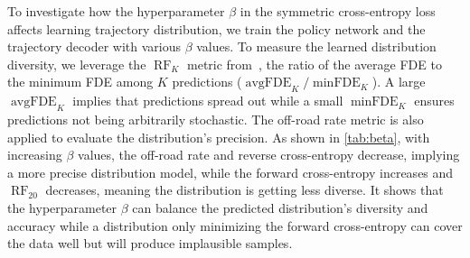 \documentclass[10pt,twocolumn,letterpaper]{article}
\begin{document}
\begin{table}
    \centering
	\vspace{-0.2cm}
	\caption{Comparison of four baselines and our method with close parameter numbers in predicting OGMs.}
	\label{tab:OGM}
\end{table}

 To investigate how the hyperparameter $\beta$ in the symmetric cross-entropy loss affects learning trajectory distribution, we train the policy network and the trajectory decoder with various $\beta$ values. To measure the learned distribution diversity, we leverage the $\operatorname{RF}_K$ metric from~\cite{park2020diverse}, \ie the ratio of the average FDE to the minimum FDE among $K$ predictions (${\operatorname{avgFDE}_K}/{\operatorname{minFDE}_K}$). A large ${\operatorname{avgFDE}_K}$ implies that predictions spread out while a small ${\operatorname{minFDE}_K}$ ensures predictions not being arbitrarily stochastic. The off-road rate metric is also applied to evaluate the distribution's precision. As shown in \cref{tab:beta}, with increasing $\beta$ values, the off-road rate and reverse cross-entropy decrease, implying a more precise distribution model, while the forward cross-entropy increases and $\operatorname{RF}_{20}$ decreases, meaning the distribution is getting less diverse. It shows that the hyperparameter $\beta$ can balance the predicted distribution's diversity and accuracy while a distribution only minimizing the forward cross-entropy can cover the data well but will produce implausible samples.
\end{document}
